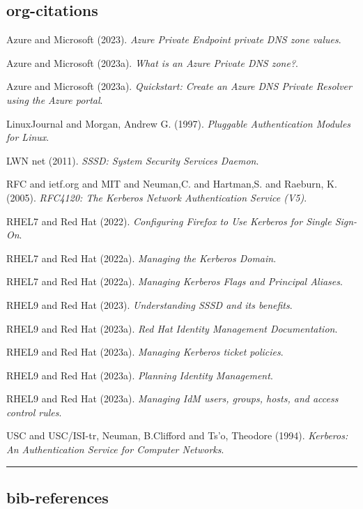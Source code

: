 \documentclass[10pt,a4paper]{article}
\def\xref{../../notes/ref/references}
\def\xref{references}
\begin{document}
\subsection{org-citations}
\label{sec:org2cc3116}
\noindent
Azure and Microsoft (2023). \emph{Azure Private Endpoint private DNS zone values}.

\noindent
Azure and Microsoft (2023a). \emph{What is an Azure Private DNS zone?}.

\noindent
Azure and Microsoft (2023a). \emph{Quickstart: Create an Azure DNS Private Resolver using the Azure portal}.

\noindent
LinuxJournal and Morgan, Andrew G.  (1997). \emph{Pluggable Authentication Modules for Linux}.

\noindent
LWN net (2011). \emph{SSSD: System Security Services Daemon}.

\noindent
RFC and ietf.org and MIT and Neuman,C. and Hartman,S. and Raeburn, K. (2005). \emph{RFC4120: The Kerberos Network Authentication Service (V5)}.

\noindent
RHEL7 and Red Hat (2022). \emph{Configuring Firefox to Use Kerberos for Single Sign-On}.

\noindent
RHEL7 and Red Hat (2022a). \emph{Managing the Kerberos Domain}.

\noindent
RHEL7 and Red Hat (2022a). \emph{Managing Kerberos Flags and Principal Aliases}.

\noindent
RHEL9 and Red Hat (2023). \emph{Understanding SSSD and its benefits}.

\noindent
RHEL9 and Red Hat (2023a). \emph{Red Hat Identity Management Documentation}.

\noindent
RHEL9 and Red Hat (2023a). \emph{Managing Kerberos ticket policies}.

\noindent
RHEL9 and Red Hat (2023a). \emph{Planning Identity Management}.

\noindent
RHEL9 and Red Hat (2023a). \emph{Managing IdM users, groups, hosts, and access control rules}.

\noindent
USC and USC/ISI-tr, Neuman, B.Clifford and Ts'o, Theodore (1994). \emph{Kerberos: An Authentication Service for Computer Networks}.


\noindent\rule{.6\textwidth}{0.8pt}

\subsection{bib-references}
\label{sec:org1013554}

\nocite{*}


\end{document}
